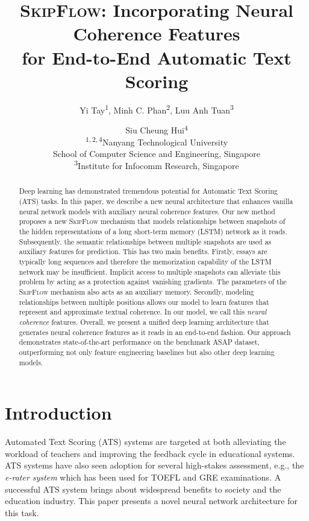 \documentclass[letterpaper]{article}
\title{\textsc{SkipFlow:} Incorporating Neural Coherence Features \\ for End-to-End Automatic Text Scoring}
\author{Yi Tay\textsuperscript{$1$}, Minh C. Phan\textsuperscript{$2$}, Luu Anh Tuan\textsuperscript{$3$} \and Siu Cheung Hui\textsuperscript{$4$}\\
\textsuperscript{$1,2,4$}\:Nanyang Technological University \\ School of Computer Science and Engineering, Singapore \\
\textsuperscript{$3$}\:Institute for Infocomm Research, Singapore \\
}
\date{}
\begin{document}
\maketitle
\begin{abstract}
Deep learning has demonstrated tremendous potential for Automatic Text Scoring (ATS) tasks. In this paper, we describe a new neural architecture that enhances vanilla neural network models with auxiliary neural coherence features. Our new method proposes a new \textsc{SkipFlow} mechanism that models relationships between snapshots of the hidden representations of a long short-term memory (LSTM) network as it reads. Subsequently, the semantic relationships between multiple snapshots are used as auxiliary features for prediction. This has two main benefits. Firstly, essays are typically long sequences and therefore the memorization capability of the LSTM network may be insufficient. Implicit access to multiple snapshots can alleviate this problem by acting as a protection against vanishing gradients. The parameters of the \textsc{SkipFlow} mechanism also acts as an auxiliary memory. Secondly, modeling relationships between multiple positions allows our model to learn features that represent and approximate textual coherence. In our model, we call this \textit{neural coherence} features. Overall, we present a unified deep learning architecture that generates neural coherence features as it reads in an end-to-end fashion. Our approach demonstrates state-of-the-art performance on the benchmark ASAP dataset, outperforming not only feature engineering baselines but also other deep learning models. 
\end{abstract}

\section{Introduction}

Automated Text Scoring (ATS) systems are targeted at both alleviating the workload of teachers and improving the feedback cycle in educational systems. ATS systems have also seen adoption for several high-stakes assessment, e.g., the \textit{e-rater system} \cite{attali2004automated} which has been used for TOEFL and GRE examinations. A successful ATS system brings about widespread benefits to society and the education industry. This paper presents a novel neural network architecture for this task. 
\end{document}
